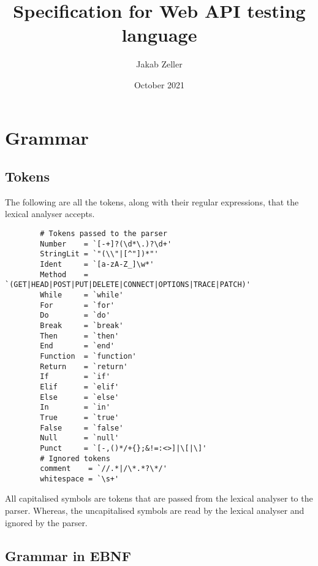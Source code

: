 \documentclass[12pt, letterpaper]{article}
\title{Specification for Web API testing language}
\author{Jakab Zeller}
\date{October 2021}
\begin{document}
\maketitle

\section{Grammar}

\subsection{Tokens}

The following are all the tokens, along with their regular expressions, that the lexical analyser accepts.

\begin{center}
    \begin{verbatim}
        # Tokens passed to the parser
        Number    = `[-+]?(\d*\.)?\d+'
        StringLit = `"(\\"|[^"])*"'
        Ident     = `[a-zA-Z_]\w*'
        Method    = `(GET|HEAD|POST|PUT|DELETE|CONNECT|OPTIONS|TRACE|PATCH)'
        While     = `while'
        For       = `for'
        Do        = `do'
        Break     = `break'
        Then      = `then'
        End       = `end'
        Function  = `function'
        Return    = `return'
        If        = `if'
        Elif      = `elif'
        Else      = `else'
        In        = `in'
        True      = `true'
        False     = `false'
        Null      = `null'
        Punct     = `[-,()*/+{};&!=:<>]|\[|\]'
        # Ignored tokens
        comment    = `//.*|/\*.*?\*/'
        whitespace = `\s+'
    \end{verbatim}
\end{center}

All capitalised symbols are tokens that are passed from the lexical analyser to the parser. Whereas, the uncapitalised symbols are read by the lexical analyser and ignored by the parser.

\subsection{Grammar in EBNF}
\end{document}
